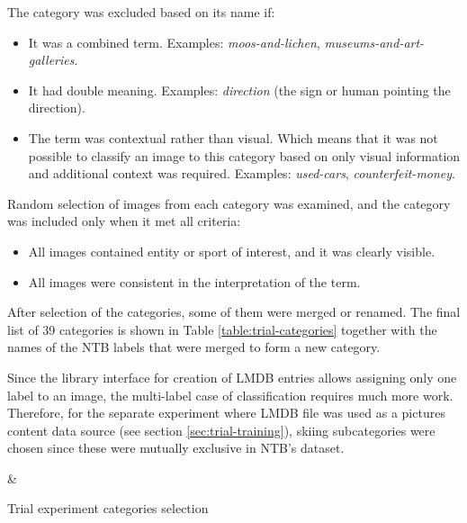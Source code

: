     The category was excluded based on its name if:
    \begin{itemize}
        \item It was a combined term. Examples: \textit{moos-and-lichen}, \textit{museums-and-art-galleries}.
        \item It had double meaning. Examples: \textit{direction} (the sign or human pointing the direction).
        \item The term was contextual rather than visual. Which means that it was not possible to classify an image to this category based on only visual information and additional context was required. Examples: \textit{used-cars}, \textit{counterfeit-money}.
    \end{itemize}
    
    Random selection of images from each category was examined, and the category was included only when it met all criteria:
    \begin{itemize}
        \item All images contained entity or sport of interest, and it was clearly visible.
        \item All images were consistent in the interpretation of the term.
    \end{itemize}
    
    After selection of the categories, some of them were merged or renamed. The final list of 39 categories is shown in Table \ref{table:trial-categories} together with the names of the NTB labels that were merged to form a new category.
    
    Since the library interface for creation of LMDB entries allows assigning only one label to an image, the multi-label case of classification requires much more work. Therefore, for the separate experiment where LMDB \cite{lmdb} file was used as a pictures content data source (see section \ref{sec:trial-training}), skiing subcategories were chosen since these were mutually exclusive in NTB's dataset.
    
    \begin{table}[H]
    \small
    \centering
    {}
    {\category & \ntbcategories}
    
    \caption{Trial experiment categories selection}
    \label{table:trial-categories}
    \end{table}
    
